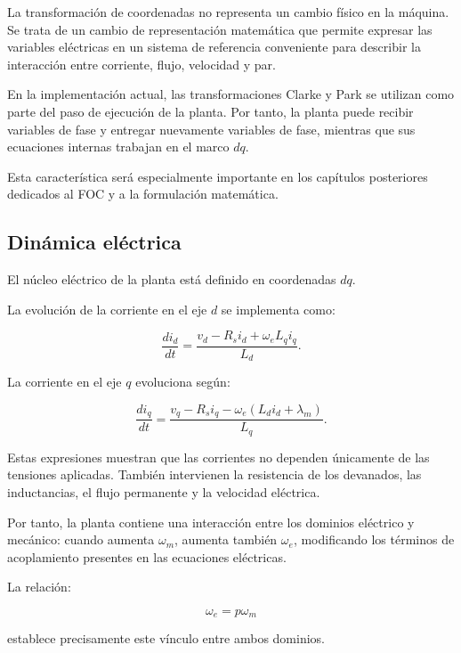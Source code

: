 La transformación de coordenadas no representa un cambio físico en la máquina. Se trata de un cambio de representación matemática que permite expresar las variables eléctricas en un sistema de referencia conveniente para describir la interacción entre corriente, flujo, velocidad y par.

En la implementación actual, las transformaciones Clarke y Park se utilizan como parte del paso de ejecución de la planta. Por tanto, la planta puede recibir variables de fase y entregar nuevamente variables de fase, mientras que sus ecuaciones internas trabajan en el marco $dq$.

Esta característica será especialmente importante en los capítulos posteriores dedicados al FOC y a la formulación matemática.

\subsection{Dinámica eléctrica}

El núcleo eléctrico de la planta está definido en coordenadas $dq$.

La evolución de la corriente en el eje $d$ se implementa como:

\begin{equation}
\frac{di_d}{dt} =
\frac{v_d-R_si_d+\omega_eL_qi_q}{L_d}.
\end{equation}

La corriente en el eje $q$ evoluciona según:

\begin{equation}
\frac{di_q}{dt} =
\frac{v_q-R_si_q-\omega_e(L_di_d+\lambda_m)}{L_q}.
\end{equation}

Estas expresiones muestran que las corrientes no dependen únicamente de las tensiones aplicadas. También intervienen la resistencia de los devanados, las inductancias, el flujo permanente y la velocidad eléctrica.

Por tanto, la planta contiene una interacción entre los dominios eléctrico y mecánico: cuando aumenta $\omega_m$, aumenta también $\omega_e$, modificando los términos de acoplamiento presentes en las ecuaciones eléctricas.

La relación:

\begin{equation}
\omega_e=p\omega_m
\end{equation}

establece precisamente este vínculo entre ambos dominios.

